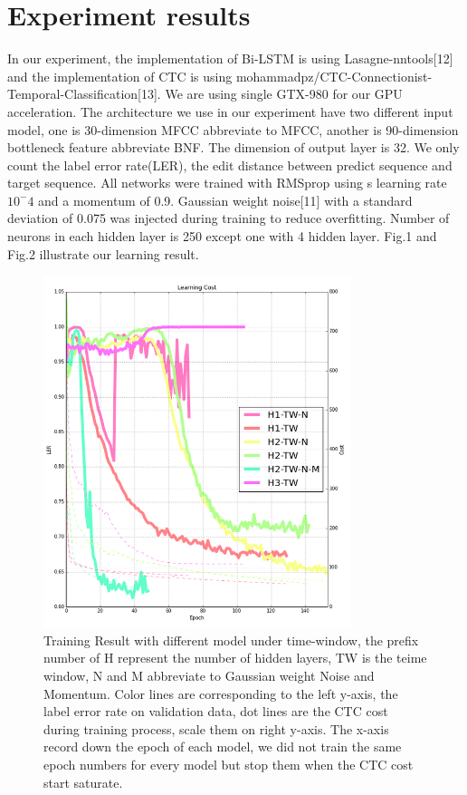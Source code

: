 \documentclass[conference]{IEEEtran}
\begin{document}
\section{Experiment results}
In our experiment, the implementation of Bi-LSTM is using Lasagne-nntools[12] and the implementation of CTC is using mohammadpz/CTC-Connectionist-Temporal-Classification[13]. We are using single GTX-980 for our GPU acceleration.
The architecture we use in our experiment have two different input model, one is 30-dimension MFCC abbreviate to MFCC, another is 90-dimension bottleneck feature abbreviate BNF.  The dimension of output layer is 32.  We only count the label error rate(LER), the edit distance between predict sequence and target sequence.  All networks were trained with RMSprop using s learning rate $10^-4$ and a momentum of 0.9.  Gaussian weight noise[11] with a standard deviation of 0.075 was injected during training to reduce overfitting.  Number of neurons in each hidden layer is 250 except one with 4 hidden layer.  Fig.1 and Fig.2 illustrate our learning result. 
\begin{figure}[h]
\includegraphics[width=9cm]{timeWindow_result_thin.png}
\caption{Training Result with different model under time-window, the prefix number of H represent the number of hidden layers, TW is the teime window, N and M abbreviate to Gaussian weight Noise and Momentum.  Color lines are corresponding to the left y-axis, the label error rate on validation data, dot lines are the CTC cost during training process, scale them on right y-axis.  The x-axis record down the epoch of each model,  we did not train the same epoch numbers for every model but stop them when the CTC cost start saturate. }
\end{figure}
\end{document}
